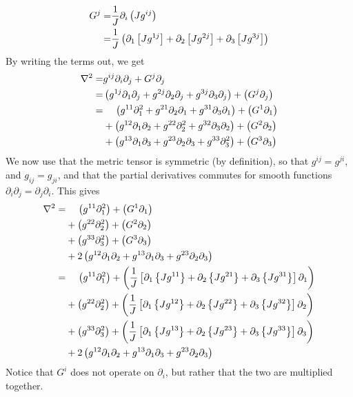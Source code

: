 %
\begin{align*}
    G^j =& \frac{1}{J} \partial_i \left(J g^{ij} \right)\\ =& \frac{1}{J} \left(
    \partial_1 \left[J g^{1j} \right] + \partial_2 \left[J g^{2j} \right] + \partial_3 \left[J
    g^{3j} \right] \right)
\end{align*}
%
By writing the terms out, we get
%
\begin{align*}
    \grad^2 =& g^{ij} \partial_i \partial_j + G^j \partial_j\\
%
            =& \L(  g^{1j} \partial_1 \partial_j + g^{2j} \partial_2 \partial_j
    + g^{3j} \partial_3 \partial_j\R) + \L(G^j \partial_j\R)\\
%
            =& \quad \, \L(  g^{11} \partial_1^2 + g^{21} \partial_2 \partial_1
    + g^{31} \partial_3 \partial_1\R) + \L(G^1 \partial_1\R)\\ &+ \L(  g^{12}
    \partial_1 \partial_2 + g^{22} \partial_2^2 + g^{32} \partial_3
    \partial_2\R) + \L(G^2 \partial_2\R)\\ &+ \L(  g^{13} \partial_1 \partial_3
    + g^{23} \partial_2 \partial_3 + g^{33} \partial_3^2\R) + \L(G^3
    \partial_3\R)
\end{align*}
%
We now use that the metric tensor is symmetric (by definition), so that $g^{ij}=g^{ji}$, and $g_{ij}=g_{ji}$, and that the partial derivatives commutes for smooth functions $\partial_i\partial_j=\partial_j\partial_i$.
This gives
%
\begin{align*}
    \grad^2 =&\quad \, \L(g^{11} \partial_1^2 \R) + \L(G^1 \partial_1\R)\\ &+
    \L(g^{22} \partial_2^2 \R) + \L(G^2 \partial_2\R)\\ &+ \L(g^{33}
    \partial_3^2\R) + \L(G^3 \partial_3\R)\\ &+ 2\L( g^{12} \partial_1
    \partial_2 + g^{13} \partial_1 \partial_3 + g^{23} \partial_2 \partial_3
    \R)\\
%
           =&\quad \, \L(g^{11} \partial_1^2\R) + \L( \frac{1}{J} \L[
\partial_1 \L\{J g^{11} \R\} + \partial_2 \L\{J g^{21} \R\} + \partial_3 \L\{J
g^{31} \R\} \R] \partial_1\R)\\ &+ \L(g^{22} \partial_2^2\R) + \L( \frac{1}{J}
    \L[ \partial_1 \L\{J g^{12} \R\} + \partial_2 \L\{J g^{22} \R\} +
    \partial_3 \L\{J g^{32} \R\} \R] \partial_2\R)\\ &+ \L(g^{33}
        \partial_3^2\R) + \L( \frac{1}{J} \L[ \partial_1 \L\{J g^{13} \R\} +
        \partial_2 \L\{J g^{23} \R\} + \partial_3 \L\{J g^{33} \R\} \R]
        \partial_3\R)\\ &+ 2\L( g^{12} \partial_1 \partial_2 + g^{13}
        \partial_1 \partial_3 + g^{23} \partial_2 \partial_3 \R)
\end{align*}
%
Notice that $G^i$ does not operate on $\partial_i$, but rather that the two are
multiplied together.


